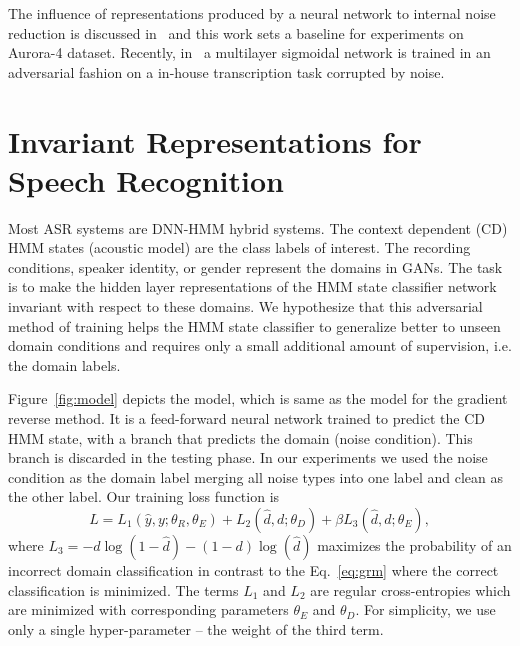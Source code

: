 \documentclass{article}
\begin{document}

The influence of representations produced by a neural network to internal noise reduction is discussed in~\cite{yu2013feature} and this work sets a baseline for experiments on  Aurora-4 dataset. Recently, in~\cite{yusuke2016adversarial} a multilayer sigmoidal network is trained in an adversarial fashion on a in-house transcription task corrupted by noise.
\section{Invariant Representations for Speech Recognition}
\label{sec:invariant-speech}

Most ASR systems are DNN-HMM hybrid systems. The context dependent (CD) HMM states (acoustic model) are the class labels of interest. The
recording conditions, speaker identity, or gender represent the domains in GANs. The task is to make the hidden layer representations of the HMM state classifier network 
invariant with respect to these domains. We hypothesize that this adversarial method of
training helps the HMM state classifier to generalize better to unseen domain conditions and requires only a  
small additional amount of supervision, i.e. the domain labels.  

Figure~\ref{fig:model} depicts the model, which is same as the model for the gradient reverse method. It is a feed-forward neural network trained to predict the CD HMM state, with a branch that predicts the domain (noise condition). This branch is discarded in the testing phase. In our experiments we
used the noise condition as the domain label merging all noise types into one label
and clean as the other label. Our training loss function is
    \begin{equation}
        L = L_1(\hat{y}, y; \theta_R, \theta_E) + 
        L_2(\hat{d}, d; \theta_D) +
        \beta L_3(\hat{d}, d; \theta_E),
        \label{eq:cost}
    \end{equation}
where $L_3 = - d\log(1 - \hat{d}) - (1-d)\log(\hat{d})$ maximizes the probability
of an incorrect domain classification in contrast to the Eq.~\ref{eq:grm} where the 
correct classification is minimized.
The terms $L_1$ and $L_2$ are 
regular cross-entropies which are minimized with corresponding parameters $\theta_E$ and $\theta_D$.
For simplicity, we use only a single hyper-parameter -- the weight of the third term.
 
\end{document}

